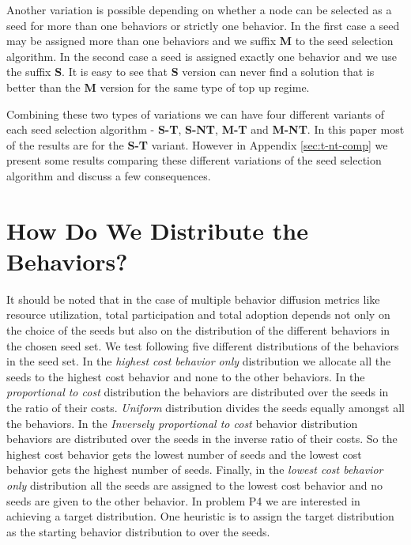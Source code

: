 \documentclass[letterpaper]{article}
\theoremstyle{plain} 		\newtheorem{thm}{Theorem}[section]
\theoremstyle{definition} 	\newtheorem{defn}[thm]{Definition}
\theoremstyle{remark}		\newtheorem{rem}{Remark}
\begin{document}
Another variation is possible depending on whether a node can be selected as a seed for more than one behaviors or strictly one behavior. In the first case a seed may be assigned more than one behaviors and we suffix \textbf{M} to the seed selection algorithm. In the second case a seed is assigned exactly one behavior and we use the suffix \textbf{S}. It is easy to see that \textbf{S} version can never find a solution that is better than the \textbf{M} version for the same type of top up regime.

Combining these two types of variations we can have four different variants of each seed selection algorithm - \textbf{S-T}, \textbf{S-NT}, \textbf{M-T} and \textbf{M-NT}. In this paper most of the results are for the \textbf{S-T} variant. However in Appendix \ref{sec:t-nt-comp} we present some results comparing these different variations of the seed selection algorithm and discuss a few consequences.

\section{How Do We Distribute the Behaviors?} \label{sec:dist}
It should be noted that in the case of multiple behavior diffusion metrics like resource utilization, total participation and total adoption depends not only on the choice of the seeds but also on the distribution of the different behaviors in the chosen seed set. We test following five different distributions of the behaviors in the seed set. In the \textit{highest cost behavior only} distribution we allocate all the seeds to the highest cost behavior and none to the other behaviors. In the \textit{proportional to cost} distribution the behaviors are distributed over the seeds in the ratio of their costs. \textit{Uniform} distribution divides the seeds equally amongst all the behaviors. In the \textit{Inversely proportional to cost} behavior distribution behaviors are distributed over the seeds in the inverse ratio of their costs. So the highest cost behavior gets the lowest number of seeds and the lowest cost behavior gets the highest number of seeds. Finally, in the \textit{lowest cost behavior only} distribution all the seeds are assigned to the lowest cost behavior and no seeds are given to the other behavior.  In problem P4 we are interested in achieving a target distribution. One heuristic is to assign the target distribution as the starting behavior distribution to over the seeds.
\end{document}

